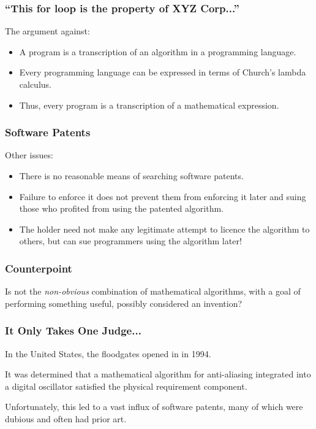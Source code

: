 \begin{frame}
\frametitle{``This for loop is the property of XYZ Corp...''}

The argument against:

\begin{itemize}
	\item A program is a transcription of an algorithm in a programming language.
	\item Every programming language can be expressed in terms of Church's lambda calculus.
	\item Thus, every program is a transcription of a mathematical expression.
\end{itemize}

\end{frame}



\begin{frame}
\frametitle{Software Patents}

Other issues:
\begin{itemize}
	\item There is no reasonable means of searching software patents.
	\item Failure to enforce it does not prevent them from enforcing it later and suing those who profited from using the patented algorithm.
	\item The holder need not make any legitimate attempt to licence the algorithm to others, but can sue programmers using the algorithm later!
\end{itemize}

\end{frame}



\begin{frame}
\frametitle{Counterpoint}

Is not the \textit{non-obvious} combination of mathematical algorithms, with a goal of performing something useful, possibly considered an invention?

\end{frame}



\begin{frame}
\frametitle{It Only Takes One Judge...}

In the United States, the floodgates opened in in 1994. 

It was determined that a mathematical algorithm for anti-aliasing integrated into a digital oscillator satisfied the physical requirement component.

Unfortunately, this led to a vast influx of software patents, many of which were dubious and often had prior art.

\end{frame}



